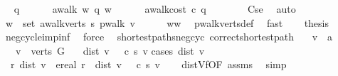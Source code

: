 \begin{isabellebody}
\ \isamarkupfalse%
\ q\ \ \isanewline
\ \ \ \ {\isachardoublequoteopen}awalk\ w\ q\ w{\isachardoublequoteclose}\ \ \isanewline
\ \ \ \ {\isachardoublequoteopen}awalk{\isacharunderscore}cost\ c\ q\ {\isacharless}\ {}{\isachardoublequoteclose}\isanewline
\ \ \ \ \isamarkupfalse%
\ C{\isacharunderscore}se\ \isamarkupfalse%
\ auto\isanewline
{}\isamarkupfalse%
\ \isanewline
\ \ \isamarkupfalse%
\ {\isachardoublequoteopen}w\ {\isasymin}\ set\ {\isacharparenleft}awalk{\isacharunderscore}verts\ s\ {\isacharparenleft}pwalk\ v{\isacharparenright}{\isacharparenright}{\isachardoublequoteclose}\isanewline
\ \ \ \ \isamarkupfalse%
\ ww\ \isamarkupfalse%
\ pwalk{\isacharunderscore}verts{\isacharunderscore}def\ \isamarkupfalse%
\ fast\isanewline
{}\isamarkupfalse%
\isanewline
\ \ \isamarkupfalse%
\ {\isacharquery}thesis\ \isamarkupfalse%
\ neg{\isacharunderscore}cycle{\isacharunderscore}imp{\isacharunderscore}inf{\isacharunderscore}{\isasymmu}\ \isamarkupfalse%
\ force\isanewline
{}\isamarkupfalse%
%
\endisatagproof
{\isafoldproof}%
%
\isadelimproof
\isanewline
%
\endisadelimproof
\isanewline
{}\isamarkupfalse%
\ {\isacharparenleft}\ shortest{\isacharunderscore}paths{\isacharunderscore}neg{\isacharunderscore}cyc{\isacharparenright}\ correct{\isacharunderscore}shortest{\isacharunderscore}path{\isacharcolon}\isanewline
\ \ \ v\ {\isacharcolon}{\isacharcolon}\ {\isacharprime}a\isanewline
\ \ \ {\isachardoublequoteopen}v\ {\isasymin}\ verts\ G{\isachardoublequoteclose}\isanewline
\ \ \ {\isachardoublequoteopen}dist\ v\ {\isacharequal}\ {\isasymmu}\ c\ s\ v{\isachardoublequoteclose}\isanewline
%
\isadelimproof
%
\endisadelimproof
%
\isatagproof
{}\isamarkupfalse%
{\isacharparenleft}cases\ {\isachardoublequoteopen}dist\ v{\isachardoublequoteclose}{\isacharparenright}\isanewline
{}\isamarkupfalse%
\ {\isachardoublequoteopen}\ {\isasymAnd}r{\isachardot}\ dist\ v\ {\isacharequal}\ ereal\ r\ {\isasymLongrightarrow}\ dist\ v\ {\isacharequal}\ {\isasymmu}\ c\ s\ v{\isachardoublequoteclose}\isanewline
\ \ \isamarkupfalse%
\ dist{\isacharunderscore}Vf{\isacharunderscore}{\isasymmu}{\isacharbrackleft}OF\ assms{\isacharbrackright}\ \isamarkupfalse%
\ simp\ \isanewline

\end{isabellebody}
